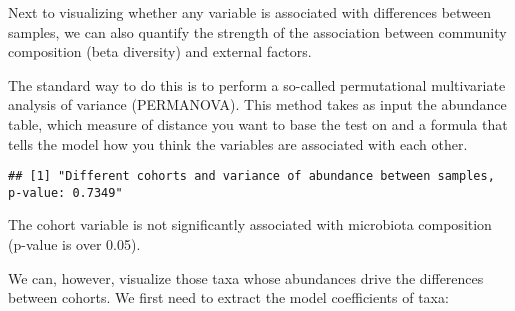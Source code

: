 \documentclass[
  oneside]{book}
\newenvironment{Shaded}{\begin{snugshade}}{\end{snugshade}}
\newcommand{\CommentTok}[1]{\textcolor[rgb]{0.56,0.35,0.01}{\textit{#1}}}
\newcommand{\DataTypeTok}[1]{\textcolor[rgb]{0.13,0.29,0.53}{#1}}
\newcommand{\DecValTok}[1]{\textcolor[rgb]{0.00,0.00,0.81}{#1}}
\newcommand{\KeywordTok}[1]{\textcolor[rgb]{0.13,0.29,0.53}{\textbf{#1}}}
\newcommand{\NormalTok}[1]{#1}
\newcommand{\OperatorTok}[1]{\textcolor[rgb]{0.81,0.36,0.00}{\textbf{#1}}}
\newcommand{\StringTok}[1]{\textcolor[rgb]{0.31,0.60,0.02}{#1}}
\begin{document}
Next to visualizing whether any variable is associated with
differences between samples, we can also quantify the strength of the
association between community composition (beta diversity) and
external factors.

The standard way to do this is to perform a so-called permutational
multivariate analysis of variance (PERMANOVA). This method takes as
input the abundance table, which measure of distance you want to base
the test on and a formula that tells the model how you think the
variables are associated with each other.

\begin{Shaded}
\end{Shaded}

\begin{verbatim}
## [1] "Different cohorts and variance of abundance between samples, p-value: 0.7349"
\end{verbatim}

The cohort variable is not significantly associated with
microbiota composition (p-value is over 0.05).

We can, however, visualize those taxa whose abundances drive the
differences between cohorts. We first need to extract the model
coefficients of taxa:
\end{document}
